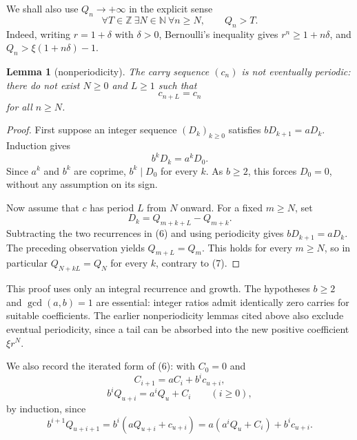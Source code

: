 \documentclass[11pt,reqno]{amsart}
\newtheorem{lemma}[theorem]{Lemma}
\theoremstyle{definition}
\theoremstyle{remark}
\begin{document}
We shall also use \(Q_n\to+\infty\) in the explicit sense
\[
\forall T\in\mathbb Z\ \exists N\in\mathbb N\ \forall n\ge N,
\qquad Q_n>T.
\tag{7}\label{eq:7}
\]
Indeed, writing \(r=1+\delta\) with \(\delta>0\), Bernoulli's inequality
gives \(r^n\ge1+n\delta\), and
\(Q_n>\xi(1+n\delta)-1\).

\begin{samepage}
\begin{lemma}[nonperiodicity]\leavevmode\label{thm:4}
The carry sequence \((c_n)\) is not
eventually periodic: there do not exist \(N\ge0\) and \(L\ge1\) such that
\[
c_{n+L}=c_n
\]
for all \(n\ge N\).
\label{thm-end:4}
\end{lemma}
\end{samepage}

\begin{proof}\leavevmode\label{proof:4}
First suppose an integer sequence \((D_k)_{k\ge0}\) satisfies
\(bD_{k+1}=aD_k\).
Induction gives
\[
b^kD_k=a^kD_0.
\]
Since \(a^k\) and \(b^k\) are coprime, \(b^k\mid D_0\) for every
\(k\). As \(b\ge2\), this forces \(D_0=0\), without any assumption on
its sign.

Now assume that \(c\) has period \(L\) from \(N\) onward. For a fixed
\(m\ge N\), set
\[
D_k=Q_{m+k+L}-Q_{m+k}.
\]
Subtracting the two recurrences in (6) and using periodicity gives
\(bD_{k+1}=aD_k\).
The preceding observation yields
\(Q_{m+L}=Q_m\).
This holds for every \(m\ge N\), so in particular
\(Q_{N+kL}=Q_N\)
for every \(k\), contrary to (7). \qedhere
\end{proof}

This proof uses only an integral recurrence and growth. The hypotheses
\(b\ge2\) and \(\gcd(a,b)=1\) are essential: integer ratios admit
identically zero carries for suitable coefficients. The earlier
nonperiodicity lemmas cited above also exclude eventual periodicity, since
a tail can be absorbed into the new positive coefficient \(\xi r^N\).

We also record the iterated form of (6): with \(C_0=0\) and
\[
C_{i+1}=aC_i+b^ic_{u+i},
\]
\[
b^iQ_{u+i}=a^iQ_u+C_i\qquad(i\ge0),
\tag{8}\label{eq:8}
\]
by induction, since
\[
b^{i+1}Q_{u+i+1}=b^i(aQ_{u+i}+c_{u+i})=a(a^iQ_u+C_i)+b^ic_{u+i}.
\]

\end{document}
